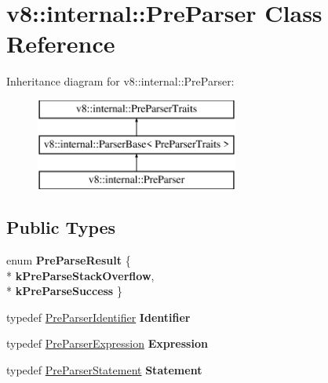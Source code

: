 \hypertarget{classv8_1_1internal_1_1_pre_parser}{}\section{v8\+:\+:internal\+:\+:Pre\+Parser Class Reference}
\label{classv8_1_1internal_1_1_pre_parser}
Inheritance diagram for v8\+:\+:internal\+:\+:Pre\+Parser\+:\begin{figure}[H]
\begin{center}
\leavevmode
\includegraphics[height=3.000000cm]{classv8_1_1internal_1_1_pre_parser}
\end{center}
\end{figure}
\subsection*{Public Types}
\begin{DoxyCompactItemize}
\item 
enum {\bfseries Pre\+Parse\+Result} \{ \\*
{\bfseries k\+Pre\+Parse\+Stack\+Overflow}, 
\\*
{\bfseries k\+Pre\+Parse\+Success}
 \}\hypertarget{classv8_1_1internal_1_1_pre_parser_ac699e8c83f71d51ea5ad08af12acf9f9}{}\label{classv8_1_1internal_1_1_pre_parser_ac699e8c83f71d51ea5ad08af12acf9f9}

\item 
typedef \hyperlink{classv8_1_1internal_1_1_pre_parser_identifier}{Pre\+Parser\+Identifier} {\bfseries Identifier}\hypertarget{classv8_1_1internal_1_1_pre_parser_a88411e7cd2cbc7a480a32471f2db01e8}{}\label{classv8_1_1internal_1_1_pre_parser_a88411e7cd2cbc7a480a32471f2db01e8}

\item 
typedef \hyperlink{classv8_1_1internal_1_1_pre_parser_expression}{Pre\+Parser\+Expression} {\bfseries Expression}\hypertarget{classv8_1_1internal_1_1_pre_parser_ae3385c22c7148a44bad3c3b3d6265867}{}\label{classv8_1_1internal_1_1_pre_parser_ae3385c22c7148a44bad3c3b3d6265867}

\item 
typedef \hyperlink{classv8_1_1internal_1_1_pre_parser_statement}{Pre\+Parser\+Statement} {\bfseries Statement}\hypertarget{classv8_1_1internal_1_1_pre_parser_a63f5606243398ad8e868162f6103eb96}{}\label{classv8_1_1internal_1_1_pre_parser_a63f5606243398ad8e868162f6103eb96}

\end{DoxyCompactItemize}

